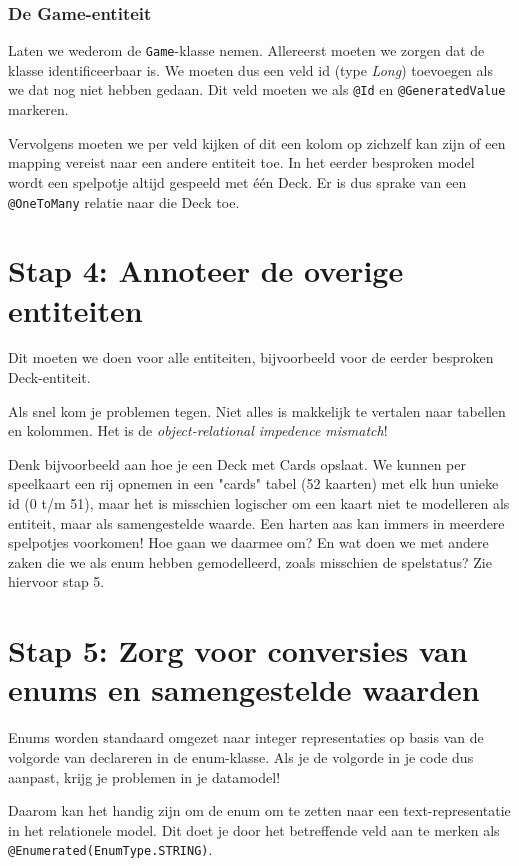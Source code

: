 \subsubsection{De Game-entiteit}
Laten we wederom de \texttt{Game}-klasse nemen. Allereerst moeten 
we zorgen dat de klasse identificeerbaar is. We moeten dus een 
veld id (type \textit{Long}) toevoegen als we dat nog niet hebben gedaan.
Dit veld moeten we als \texttt{@Id} en \texttt{@GeneratedValue} markeren.

Vervolgens moeten we per veld kijken of dit een kolom op zichzelf kan zijn 
of een mapping vereist naar een andere entiteit toe. In het eerder besproken model 
wordt een spelpotje altijd gespeeld met één Deck. Er is dus sprake van een 
\texttt{@OneToMany} relatie naar die Deck toe.

\section{Stap 4: Annoteer de overige entiteiten}
Dit moeten we doen voor alle entiteiten, bijvoorbeeld voor de 
eerder besproken Deck-entiteit. 

Als snel kom je problemen tegen. Niet alles is makkelijk te vertalen naar 
tabellen en kolommen. Het is de \textit{object-relational impedence mismatch}!

Denk bijvoorbeeld aan hoe je een Deck met Cards opslaat.
We kunnen per speelkaart 
een rij opnemen in een "cards" tabel (52 kaarten) 
met elk hun unieke id (0 t/m 51), maar het is misschien logischer 
om een kaart niet te modelleren als entiteit, maar als samengestelde waarde.
Een harten aas kan immers in meerdere spelpotjes voorkomen!
Hoe gaan we daarmee om? En wat doen we met andere zaken die 
we als enum hebben gemodelleerd, zoals misschien de spelstatus?
Zie hiervoor stap 5.

\section{Stap 5: Zorg voor conversies van enums en samengestelde waarden}
Enums worden standaard omgezet naar integer representaties
op basis van de volgorde van declareren in de enum-klasse.
Als je de volgorde in je code dus aanpast, krijg je problemen 
in je datamodel!

Daarom kan het handig zijn om de enum om te zetten naar een 
text-representatie in het relationele model. Dit doet je 
door het betreffende veld aan te merken als \texttt{@Enumerated(EnumType.STRING)}. 


